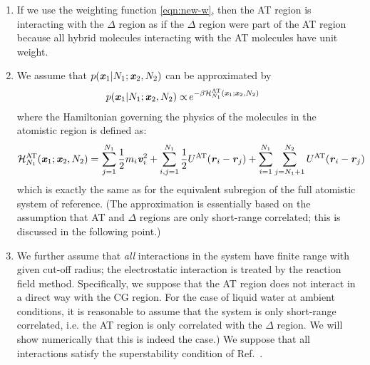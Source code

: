 \documentclass[aip,jcp,a4paper,reprint,onecolumn]{revtex4-1}
\newcommand{\vect}[1]{\textbf{\textit{#1}}}
\newcommand{\AT}{{\textrm{{AT}}}}
\newcommand{\HY}{{\Delta}}
\begin{document}
\begin{enumerate}

\item If we use the weighting function \eqref{eqn:new-w},
then the AT region is interacting with the $\HY$ region
as if the $\HY$ region were part of the AT region because
all hybrid molecules interacting with the AT molecules have unit weight.

\item We assume that $p(\vect x_1 | N_1; \vect x_2, N_2)$  can be approximated by
\begin{align}\label{eqn:p-1-1}
  p(\vect x_1 | N_1; \vect x_2, N_2)
  \propto &\,
  e^{-\beta\mathcal H_{N_1}^{\AT}(\vect x_1; \vect x_2, N_2)}
\end{align}
where the Hamiltonian governing the physics of the molecules in the atomistic region is defined as:
\begin{align}\label{eqn:p-1-2}
  \mathcal H_{N_1}^{{\AT}}(\vect x_1; \vect x_2, N_2) = &\,
  \sum_{j=1}^{N_1}\frac12 m_i\vect v_i^2 + 
  \sum_{i,j=1}^{N_1}\frac12 U^{{\AT}}(\vect r_i - \vect r_j)  +
  \sum_{i=1}^{N_1}\sum_{j=N_1+1}^{N_2} U^{{\AT}}(\vect r_i - \vect r_j)   
\end{align}
which is exactly the same as for the equivalent subregion of the full atomistic system of reference. (The approximation is essentially based on the assumption that AT and $\Delta$ regions are only short-range correlated; this is discussed in the following point.)

\item We further assume that \emph{all} interactions in the system have finite range with given cut-off radius; the
  electrostatic interaction is treated by the reaction field method. Specifically, we suppose that 
  the AT region does not interact in a direct way with the CG region.
  For the case of liquid water at ambient conditions, it is reasonable to assume that the system is only short-range correlated, i.e. the AT region is only correlated with the $\HY$ region. We will show numerically that this is indeed the case.)
  We suppose that all interactions satisfy the superstability condition of Ref.~.
  

\end{enumerate}
\end{document}
